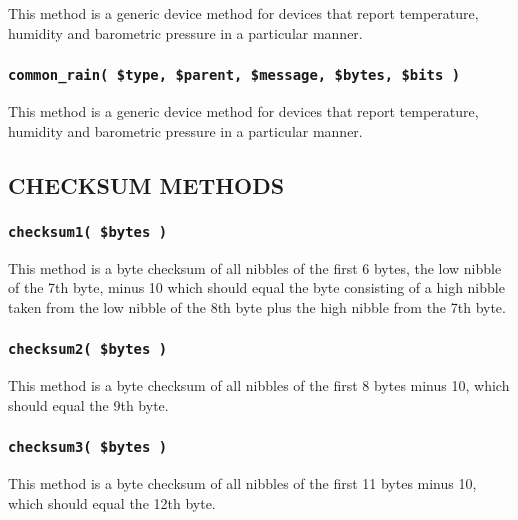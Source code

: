 This method is a generic device method for devices that report
temperature, humidity and barometric pressure in a particular manner.

\subsubsection*{\texttt{common\_rain( \$type, \$parent, \$message, \$bytes, \$bits )}\label{xPL::RF::Oregon_common_rain_type_parent_message_bytes_bits_}}


This method is a generic device method for devices that report
temperature, humidity and barometric pressure in a particular manner.

\subsection*{CHECKSUM METHODS\label{xPL::RF::Oregon_CHECKSUM_METHODS}}
\subsubsection*{\texttt{checksum1( \$bytes )}\label{xPL::RF::Oregon_checksum1_bytes_}}


This method is a byte checksum of all nibbles of the first 6 bytes,
the low nibble of the 7th byte, minus 10 which should equal the byte
consisting of a high nibble taken from the low nibble of the 8th byte
plus the high nibble from the 7th byte.

\subsubsection*{\texttt{checksum2( \$bytes )}\label{xPL::RF::Oregon_checksum2_bytes_}}


This method is a byte checksum of all nibbles of the first 8 bytes
minus 10, which should equal the 9th byte.

\subsubsection*{\texttt{checksum3( \$bytes )}\label{xPL::RF::Oregon_checksum3_bytes_}}


This method is a byte checksum of all nibbles of the first 11 bytes
minus 10, which should equal the 12th byte.

